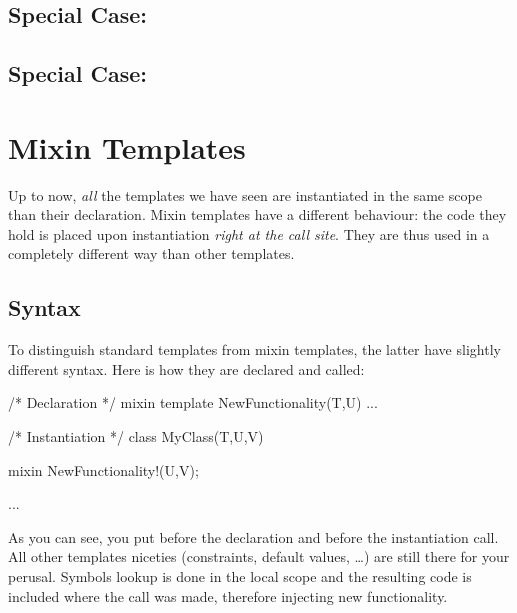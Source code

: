 \subsection{\texorpdfstring{Special Case: }
                           {Special Case: in}}
                           
\subsection{\texorpdfstring{Special Case: }
                           {Special Case: cast}}

\section{Mixin Templates}\label{mixintemplates}

Up to now, \emph{all} the templates we have seen are instantiated in the same scope than their declaration. Mixin templates have a different behaviour: the code they hold is placed upon instantiation \emph{right at the call site}. They are thus used in a completely different way than other templates.

\subsection{Syntax}\label{mixintemplatessyntax}

To distinguish standard templates from mixin templates, the latter have slightly different syntax. Here is how they are declared and called:

\begin{dcode}
/* Declaration */
mixin template NewFunctionality(T,U) { ... }


/* Instantiation */
class MyClass(T,U,V)
{
    mixin NewFunctionality!(U,V);

    ...
}
\end{dcode}

As you can see, you put  before the declaration and  before the instantiation call. All other templates niceties (constraints, default values, \ldots) are still there for your perusal. Symbols lookup is done in the local scope and the resulting code is included where the call was made, therefore injecting new functionality.

